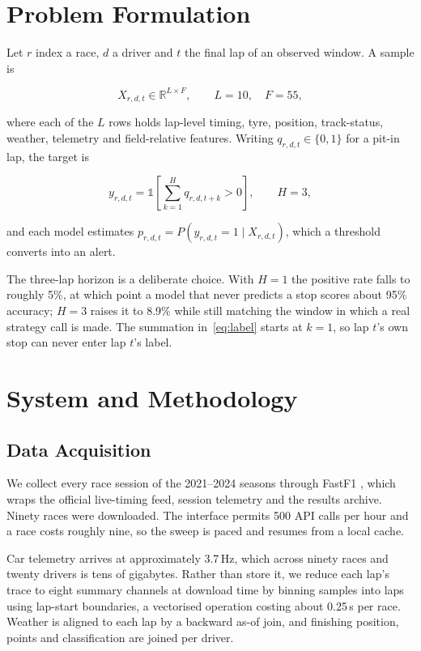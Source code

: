 \documentclass[conference]{IEEEtran}
\begin{document}
\section{Problem Formulation}

Let $r$ index a race, $d$ a driver and $t$ the final lap of an observed window. A sample is

\begin{equation}
X_{r,d,t} \in \mathbb{R}^{L\times F}, \qquad L=10,\quad F=55,
\label{eq:input}
\end{equation}

where each of the $L$ rows holds lap-level timing, tyre, position, track-status, weather, telemetry and field-relative features. Writing $q_{r,d,t}\in\{0,1\}$ for a pit-in lap, the target is

\begin{equation}
y_{r,d,t}=\mathbb{1}\!\left[\sum_{k=1}^{H}q_{r,d,t+k}>0\right], \qquad H=3,
\label{eq:label}
\end{equation}

and each model estimates $p_{r,d,t}=P(y_{r,d,t}=1\mid X_{r,d,t})$, which a threshold converts into an alert.

The three-lap horizon is a deliberate choice. With $H=1$ the positive rate falls to roughly 5\%, at which point a model that never predicts a stop scores about 95\% accuracy; $H=3$ raises it to 8.9\% while still matching the window in which a real strategy call is made. The summation in~\eqref{eq:label} starts at $k=1$, so lap $t$'s own stop can never enter lap $t$'s label.

\section{System and Methodology}

\subsection{Data Acquisition}

We collect every race session of the 2021--2024 seasons through FastF1 \cite{fastf1docs}, which wraps the official live-timing feed, session telemetry and the results archive. Ninety races were downloaded. The interface permits 500 API calls per hour and a race costs roughly nine, so the sweep is paced and resumes from a local cache.

Car telemetry arrives at approximately 3.7\,Hz, which across ninety races and twenty drivers is tens of gigabytes. Rather than store it, we reduce each lap's trace to eight summary channels at download time by binning samples into laps using lap-start boundaries, a vectorised operation costing about 0.25\,s per race. Weather is aligned to each lap by a backward as-of join, and finishing position, points and classification are joined per driver.
\end{document}
